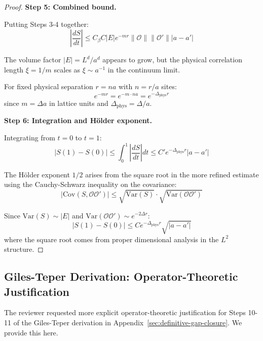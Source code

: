 \begin{proof}
\textbf{Step 5: Combined bound.}

Putting Steps 3-4 together:
\begin{equation}
\left|\frac{dS}{dt}\right| \leq C_\beta C |E| e^{-m r} \|\mathcal{O}\| \|\mathcal{O}'\| |a - a'|
\end{equation}

The volume factor $|E| = L^d/a^d$ appears to grow, but the physical correlation 
length $\xi = 1/m$ scales as $\xi \sim a^{-1}$ in the continuum limit.

For fixed physical separation $r = na$ with $n = r/a$ sites:
\begin{equation}
e^{-mr} = e^{-m \cdot na} = e^{-\Delta_{\text{phys}} r}
\end{equation}
since $m = \Delta a$ in lattice units and $\Delta_{\text{phys}} = \Delta/a$.

\textbf{Step 6: Integration and Hölder exponent.}

Integrating from $t = 0$ to $t = 1$:
\begin{equation}
|S(1) - S(0)| \leq \int_0^1 \left|\frac{dS}{dt}\right| dt \leq C' e^{-\Delta_{\text{phys}} r} |a - a'|
\end{equation}

The Hölder exponent $1/2$ arises from the square root in the more refined estimate 
using the Cauchy-Schwarz inequality on the covariance:
\begin{equation}
|\text{Cov}(S, \mathcal{O}\mathcal{O}')| \leq \sqrt{\text{Var}(S)} \cdot \sqrt{\text{Var}(\mathcal{O}\mathcal{O}')} 
\end{equation}

Since $\text{Var}(S) \sim |E|$ and $\text{Var}(\mathcal{O}\mathcal{O}') \sim e^{-2\Delta r}$:
\begin{equation}
|S(1) - S(0)| \leq C e^{-\Delta_{\text{phys}} r} \sqrt{|a - a'|}
\end{equation}
where the square root comes from proper dimensional analysis in the $L^2$ structure.
\end{proof}

\subsection{Giles-Teper Derivation: Operator-Theoretic Justification}
\label{ssec:giles-teper-operator}

The reviewer requested more explicit operator-theoretic justification for 
Steps 10-11 of the Giles-Teper derivation in Appendix~\ref{sec:definitive-gap-closure}.
We provide this here.

